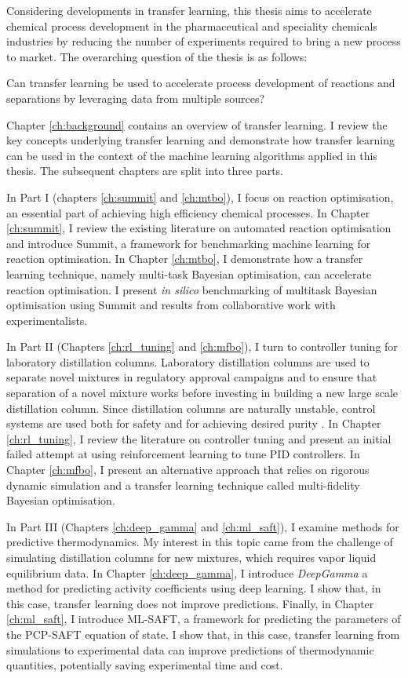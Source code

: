 Considering developments in transfer learning, this thesis aims to accelerate chemical process development in the pharmaceutical and speciality chemicals industries by reducing the number of experiments required to bring a new process to market. The overarching question of the thesis is as follows:
\begin{displayquote}
Can transfer learning be used to accelerate process development of reactions and separations by leveraging data from multiple sources? 
\end{displayquote}

Chapter \ref{ch:background} contains an overview of transfer learning. I review the key concepts underlying transfer learning and demonstrate how transfer learning can be used in the context of the machine learning algorithms applied in this thesis.  The subsequent chapters are split into three parts.

In Part I (chapters \ref{ch:summit} and \ref{ch:mtbo}), I focus on reaction optimisation, an essential part of achieving high efficiency chemical processes. In Chapter \ref{ch:summit}, I review the existing literature on automated reaction optimisation and introduce Summit, a framework for benchmarking machine learning for reaction optimisation.  In Chapter \ref{ch:mtbo}, I demonstrate how a transfer learning technique, namely multi-task Bayesian optimisation, can accelerate reaction optimisation. I present \textit{in silico} benchmarking of multitask Bayesian optimisation using Summit and results from collaborative work with experimentalists.

In Part II (Chapters \ref{ch:rl_tuning} and \ref{ch:mfbo}), I turn to controller tuning for laboratory distillation columns. Laboratory distillation columns are used to separate novel mixtures in regulatory approval campaigns and to ensure that separation of a novel mixture works before investing in building a new large scale distillation column. Since distillation columns are naturally unstable, control systems are used both for safety and for achieving desired purity \cite{Skogestad2007}. In Chapter \ref{ch:rl_tuning}, I review the literature on controller tuning and present an initial failed attempt at using reinforcement learning to tune PID controllers. In Chapter \ref{ch:mfbo}, I present an alternative approach that relies on rigorous dynamic simulation and a transfer learning technique called multi-fidelity Bayesian optimisation.

In Part III (Chapters \ref{ch:deep_gamma} and \ref{ch:ml_saft}), I examine methods for predictive thermodynamics. My interest in this topic came from the challenge of simulating distillation columns for new mixtures, which requires vapor liquid equilibrium data. In Chapter \ref{ch:deep_gamma}, I introduce \textit{DeepGamma} a method for predicting activity coefficients using deep learning. I show that, in this case, transfer learning does not improve predictions. Finally, in Chapter \ref{ch:ml_saft}, I introduce ML-SAFT, a framework for predicting the parameters of the PCP-SAFT equation of state. I show that, in this case, transfer learning from simulations to experimental data can improve predictions of thermodynamic quantities, potentially saving experimental time and cost.

